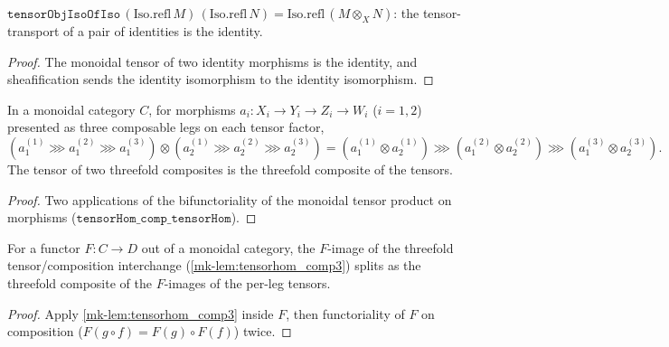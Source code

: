 \begin{lemma}\label{mk-lem:tensorobjisoofiso_refl}
  \leanok

  \(\mathtt{tensorObjIsoOfIso}\,(\mathrm{Iso.refl}\,M)\,(\mathrm{Iso.refl}\,N)
    = \mathrm{Iso.refl}\,(M \otimes_X N)\): the tensor-transport of a pair of identities is the
  identity.
\end{lemma}
\begin{proof}
  \leanok
  The monoidal tensor of two identity morphisms is the identity, and sheafification sends the
  identity isomorphism to the identity isomorphism.
\end{proof}
\begin{lemma}\label{mk-lem:tensorhom_comp3}
  \leanok

  In a monoidal category \(C\), for morphisms \(a_i : X_i \to Y_i \to Z_i \to W_i\)
  (\(i = 1,2\)) presented as three composable legs on each tensor factor,
  \[
    (a_1^{(1)} \ggg a_1^{(2)} \ggg a_1^{(3)}) \otimes (a_2^{(1)} \ggg a_2^{(2)} \ggg a_2^{(3)})
      = (a_1^{(1)} \otimes a_2^{(1)}) \ggg (a_1^{(2)} \otimes a_2^{(2)}) \ggg (a_1^{(3)} \otimes a_2^{(3)}).
  \]
  The tensor of two threefold composites is the threefold composite of the tensors.
\end{lemma}
\begin{proof}
  \leanok

Two applications of the bifunctoriality of the monoidal tensor product on morphisms
  (\(\mathtt{tensorHom\_comp\_tensorHom}\)).
\end{proof}

\begin{lemma}\label{mk-lem:map_tensorhom_comp3}
  \leanok

  For a functor \(F : C \to D\) out of a monoidal category, the \(F\)-image of the
  threefold tensor/composition interchange (\ref{mk-lem:tensorhom_comp3}) splits as the
  threefold composite of the \(F\)-images of the per-leg tensors.
\end{lemma}
\begin{proof}
  \leanok
  Apply \ref{mk-lem:tensorhom_comp3} inside \(F\), then functoriality of \(F\) on composition
  (\(F(g \circ f) = F(g) \circ F(f)\)) twice.
\end{proof}

